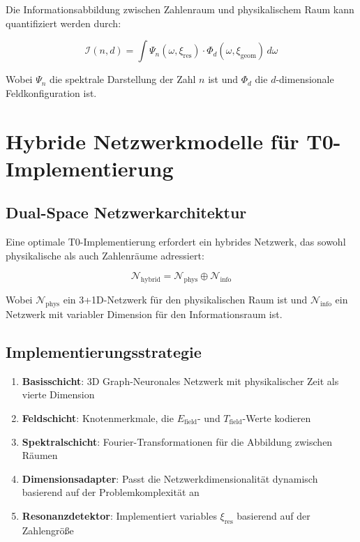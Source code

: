 \documentclass[12pt,a4paper]{article}
\newcommand{\xipar}{\ensuremath{\xi}}
\begin{document}
	Die Informationsabbildung zwischen Zahlenraum und physikalischem Raum kann quantifiziert werden durch:
	
	\begin{equation}
		\mathcal{I}(n, d) = \int \Psi_n(\omega, \xipar_{\text{res}}) \cdot \Phi_d(\omega, \xipar_{\text{geom}}) \, d\omega
	\end{equation}
	
	Wobei $\Psi_n$ die spektrale Darstellung der Zahl $n$ ist und $\Phi_d$ die $d$-dimensionale Feldkonfiguration ist.
	
	\section{Hybride Netzwerkmodelle für T0-Implementierung}
	\label{sec:hybrid_models}
	
	\subsection{Dual-Space Netzwerkarchitektur}
	\label{subsec:dual_space}
	
	Eine optimale T0-Implementierung erfordert ein hybrides Netzwerk, das sowohl physikalische als auch Zahlenräume adressiert:
	
	\begin{equation}
		\mathcal{N}_{\text{hybrid}} = \mathcal{N}_{\text{phys}} \oplus \mathcal{N}_{\text{info}}
	\end{equation}
	
	Wobei $\mathcal{N}_{\text{phys}}$ ein 3+1D-Netzwerk für den physikalischen Raum ist und $\mathcal{N}_{\text{info}}$ ein Netzwerk mit variabler Dimension für den Informationsraum ist.
	
	\subsection{Implementierungsstrategie}
	\label{subsec:implementation_strategy}
	
	\begin{tcolorbox}[colback=blue!5!white,colframe=blue!75!black,title=Optimale T0-Netzwerk-Implementierungsstrategie]
		\begin{enumerate}
			\item \textbf{Basisschicht}: 3D Graph-Neuronales Netzwerk mit physikalischer Zeit als vierte Dimension
			\item \textbf{Feldschicht}: Knotenmerkmale, die $E_{\text{field}}$- und $T_{\text{field}}$-Werte kodieren
			\item \textbf{Spektralschicht}: Fourier-Transformationen für die Abbildung zwischen Räumen
			\item \textbf{Dimensionsadapter}: Passt die Netzwerkdimensionalität dynamisch basierend auf der Problemkomplexität an
			\item \textbf{Resonanzdetektor}: Implementiert variables $\xipar_{\text{res}}$ basierend auf der Zahlengröße
		\end{enumerate}
	\end{tcolorbox}
	
\end{document}
